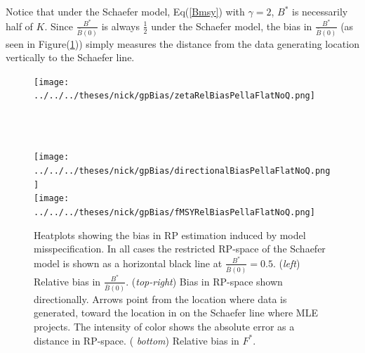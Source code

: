 \documentclass[12pt]{article}
\begin{document}
%
Notice that under the Schaefer model, Eq(\ref{Bmsy}) with $\gamma=2$, 
$B^*$ is necessarily half of $K$. Since $\frac{B^*}{\bar B(0)}$ is always 
$\frac{1}{2}$ under the Schaefer model, the bias in $\frac{B^*}{\bar B(0)}$ 
(as seen in Figure(\ref{flatTrio})) simply measures the distance 
from the data generating location vertically to the Schaefer line.  


%
\begin{figure}[h!]
\begin{minipage}[h!]{0.49\textwidth}
\hspace*{-0.5cm}
\texttt{[image: ../../../theses/nick/gpBias/zetaRelBiasPellaFlatNoQ.png]}\\
\caption{\label{flatTrio}
Heatplots showing the bias in RP estimation induced by model misspecification. 
In all cases the restricted RP-space of the Schaefer model is 
shown as a horizontal black line at $\frac{B^*}{\bar B(0)}=0.5$.  
(\emph{left}) Relative bias in $\frac{B^*}{\bar B(0)}$.  (\emph{top-right}) 
Bias in RP-space shown directionally. Arrows point from the location where 
data is generated, toward the location in on the Schaefer line where MLE 
projects. The intensity of color shows the absolute error as a distance in 
RP-space. (\emph{ bottom}) Relative bias in $F^*$.  
}
$~$\\$~$\\
\end{minipage} 
\begin{minipage}[h!]{0.49\textwidth} 
\hspace*{1cm}
\texttt{[image: ../../../theses/nick/gpBias/directionalBiasPellaFlatNoQ.png]}\\
\hspace*{1cm}
\texttt{[image: ../../../theses/nick/gpBias/fMSYRelBiasPellaFlatNoQ.png]}
\end{minipage}
\end{figure}
\end{document}
